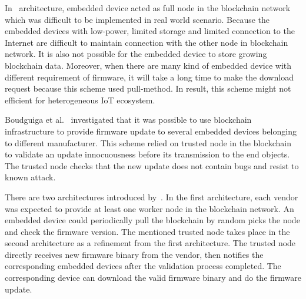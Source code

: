 \sloppy In~\cite{lee} architecture, embedded device acted as full node in the blockchain network which was difficult to be implemented in real world scenario. Because the embedded devices with low-power, limited storage and limited connection to the Internet are difficult to maintain connection with the other node in blockchain network. It is also not possible for the embedded device to store growing blockchain data. Moreover, when there are many kind of embedded device with different requirement of firmware, it will take a long time to make the download request because this scheme used pull-method. In result, this scheme might not efficient for heterogeneous IoT ecosystem.

Boudguiga et al.~\cite{boudguiga} investigated that it was possible to use blockchain infrastructure to provide firmware update to several embedded devices belonging to different manufacturer. This scheme relied on trusted node in the blockchain to validate an update innocuousness before its transmission to the end objects. The trusted node checks that the new update does not contain bugs and resist to known attack.

There are two architectures introduced by~\cite{boudguiga}. In the first architecture, each vendor was expected to provide at least one worker node in the blockchain network. An embedded device could periodically pull the blockchain by random picks the node and check the firmware version. The mentioned trusted node takes place in the second architecture as a refinement from the first architecture. The trusted node directly receives new firmware binary from the vendor, then notifies the corresponding embedded devices after the validation process completed. The corresponding device can download the valid firmware binary and do the firmware update.
